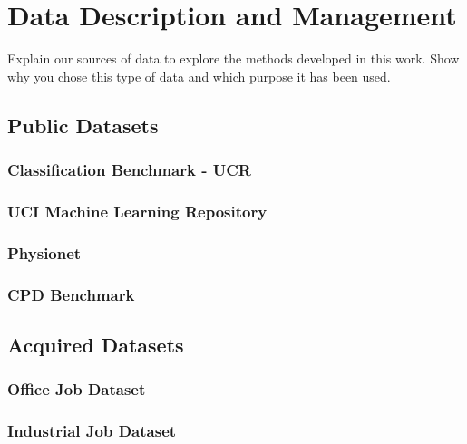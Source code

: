 
%

\chapter{Data Description and Management}
\label{cha:data}

Explain our sources of data to explore the methods developed in this work. Show why you chose this type of data and which purpose it has been used. 


\section{Public Datasets}

\subsection{Classification Benchmark - UCR}
\subsection{UCI Machine Learning Repository}
\subsection{Physionet}
\subsection{CPD Benchmark}

\section{Acquired Datasets}

\subsection{Office Job Dataset}
\subsection{Industrial Job Dataset}